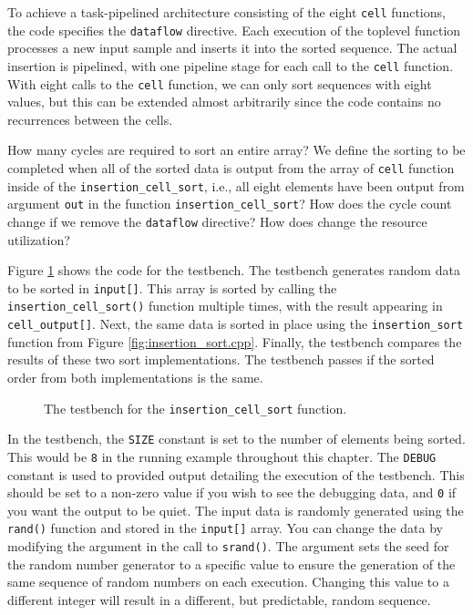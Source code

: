 To achieve a task-pipelined architecture consisting of the eight \lstinline{cell} functions, the code specifies the \lstinline{dataflow} directive. Each execution of the toplevel function processes a new input sample and inserts it into the sorted sequence.  The actual insertion is pipelined, with one pipeline stage for each call to the \lstinline{cell} function. With eight calls to the \lstinline{cell} function, we can only sort sequences with eight values, but this can be extended almost arbitrarily since the code contains no recurrences between the cells.

\begin{exercise}
How many cycles are required to sort an entire array? We define the sorting to be completed when all of the sorted data is output from the array of \lstinline{cell} function inside of the \lstinline{insertion_cell_sort}, i.e., all eight elements have been output from argument \lstinline{out} in the function \lstinline{insertion_cell_sort}? How does the cycle count change if we remove the \lstinline{dataflow} directive? How does change the resource utilization?
\end{exercise}

Figure \ref{fig:insertion_cell_sort_test.cpp} shows the code for the testbench. The testbench generates random data to be sorted in \lstinline{input[]}. This array is sorted by calling the \lstinline{insertion_cell_sort()} function multiple times, with the result appearing in \lstinline{cell_output[]}. Next, the same data is sorted in place using the \lstinline{insertion_sort} function from Figure \ref{fig:insertion_sort.cpp}. Finally, the testbench compares the results of these two sort implementations. The testbench passes if the sorted order from both implementations is the same.

\begin{figure}
\footnotesize
%
\caption{  The testbench for the \lstinline{insertion_cell_sort} function. }
\label{fig:insertion_cell_sort_test.cpp}
\end{figure}

In the testbench, the \lstinline{SIZE} constant is set to the number of elements being sorted. This would be \lstinline{8} in the running example throughout this chapter. The \lstinline{DEBUG} constant is used to provided output detailing the execution of the testbench. This should be set to a non-zero value if you wish to see the debugging data, and \lstinline{0} if you want the output to be quiet. The input data is randomly generated using the \lstinline{rand()} function and stored in the \lstinline{input[]} array. You can change the data by modifying the argument in the call to \lstinline{srand()}.  The argument sets the seed for the random number generator to a specific value to ensure the generation of the same sequence of random numbers on each execution.  Changing this value to a different integer will result in a different, but predictable, random sequence.


